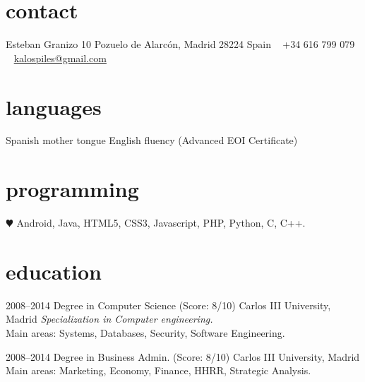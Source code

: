 \documentclass[]{friggeri-cv} %
\begin{document}


\begin{aside} %
\section{contact}
Esteban Granizo 10
Pozuelo de Alarcón, Madrid 28224
Spain
~
+34 616 799 079
~
\href{mailto:kalospiles@gmail.com}{kalospiles@gmail.com}
\section{languages}
Spanish mother tongue
English fluency (Advanced EOI Certificate)
\section{programming}
{\color{red} $\varheartsuit$} Android, Java,
HTML5, CSS3, Javascript, 
PHP, Python, C, C++.
\end{aside}


\section{education}

\begin{entrylist}
\entry
{2008--2014}
{Degree {\normalfont in Computer Science} (Score: 8/10)}
{Carlos III University, Madrid}
{\emph{Specialization in Computer engineering.} \\
 Main areas: Systems, Databases, Security, Software Engineering.}

\entry
{2008--2014}
{Degree {\normalfont in Business Admin.} (Score: 8/10)}
{Carlos III University, Madrid}
{Main areas: Marketing, Economy, Finance, HHRR, Strategic Analysis. }

\end{entrylist}
\end{document}
